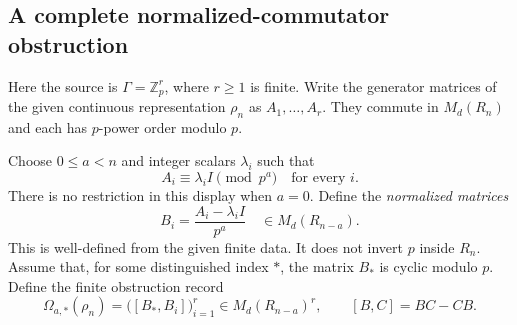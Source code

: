 \documentclass[11pt]{article}
\theoremstyle{definition}
\theoremstyle{remark}
\begin{document}
\subsection{A complete normalized-commutator obstruction}

Here the source is $\Gamma=\mathbb Z_p^r$, where $r\geq1$ is finite. Write the generator matrices of the given continuous representation $\rho_n$ as $A_1,\ldots,A_r$. They commute in $M_d(R_n)$ and each has $p$-power order modulo $p$.

Choose $0\leq a<n$ and integer scalars $\lambda_i$ such that
\[
 A_i\equiv\lambda_i I\pmod{p^a}\quad\text{for every }i.
\]
There is no restriction in this display when $a=0$. Define the \emph{normalized matrices}
\[
 B_i=\frac{A_i-\lambda_i I}{p^a}
 \quad\in M_d(R_{n-a}).
\]
This is well-defined from the given finite data. It does not invert $p$ inside $R_n$. Assume that, for some distinguished index $*$, the matrix $B_*$ is cyclic modulo $p$. Define the finite obstruction record
\[
 \boxed{\Omega_{a,*}(\rho_n)=
 \bigl([B_*,B_i]\bigr)_{i=1}^r\in M_d(R_{n-a})^r,}
 \qquad [B,C]=BC-CB.
\]
\end{document}
